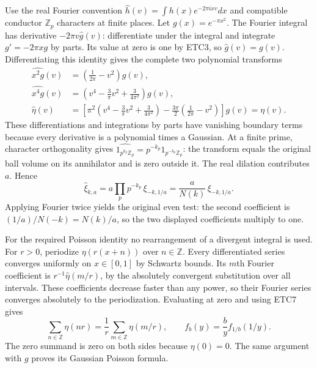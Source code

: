 Use the real Fourier convention
$\widehat h(v)=\int h(x)e^{-2\pi ixv}dx$ and compatible conductor
$\mathbb Z_p$ characters at finite places. Let $g(x)=e^{-\pi x^2}$.
The Fourier integral has derivative $-2\pi v\widehat g(v)$:
differentiate under the integral and integrate $g'=-2\pi xg$ by
parts. Its value at zero is one by ETC3, so $\widehat g(v)=g(v)$.
Differentiating this identity gives the complete two polynomial
transforms
\begin{equation}\tag{ETC7}
 \begin{split}
 \widehat{x^2g}(v)&=\left(\frac1{2\pi}-v^2\right)g(v),\\
 \widehat{x^4g}(v)&=
       \left(v^4-\frac3\pi v^2+\frac3{4\pi^2}\right)g(v),\\
 \widehat\eta(v)&=\left[
 \pi^2\left(v^4-\frac3\pi v^2+\frac3{4\pi^2}\right)
 -\frac{3\pi}{2}\left(\frac1{2\pi}-v^2\right)\right]g(v)
 =\eta(v).
 \end{split}
\end{equation}
These differentiations and integrations by parts have vanishing
boundary terms because every derivative is a polynomial times a
Gaussian. At a finite prime, character orthogonality gives
$\widehat{1_{p^{k_p}\mathbb Z_p}}
 =p^{-k_p}1_{p^{-k_p}\mathbb Z_p}$: the transform equals the
original ball volume on its annihilator and is zero outside it.
The real dilation contributes $a$. Hence
\begin{equation}\tag{ETC8}
 \widehat\xi_{k,a}
 =a\prod_pp^{-k_p}\,\xi_{-k,1/a}
 =\frac a{N(k)}\,\xi_{-k,1/a}.
\end{equation}
Applying Fourier twice yields the original even test: the second
coefficient is $(1/a)/N(-k)=N(k)/a$, so the two displayed coefficients
multiply to one.

For the required Poisson identity no rearrangement of a divergent
integral is used. For $r>0$, periodize $\eta(r(x+n))$ over
$n\in\mathbb Z$. Every differentiated series converges uniformly
on $x\in[0,1]$ by Schwartz bounds. Its $m$th Fourier coefficient
is $r^{-1}\widehat\eta(m/r)$, by the absolutely convergent
substitution over all intervals. These coefficients decrease faster
than any power, so their Fourier series converges absolutely to the
periodization. Evaluating at zero and using ETC7 gives
\begin{equation}\tag{ETC9}
 \sum_{n\in\mathbb Z}\eta(nr)
 =\frac1r\sum_{m\in\mathbb Z}\eta(m/r),\qquad
 f_b(y)=\frac b y f_{1/b}(1/y).
\end{equation}
The zero summand is zero on both sides because $\eta(0)=0$.
The same argument with $g$ proves its Gaussian Poisson formula.

